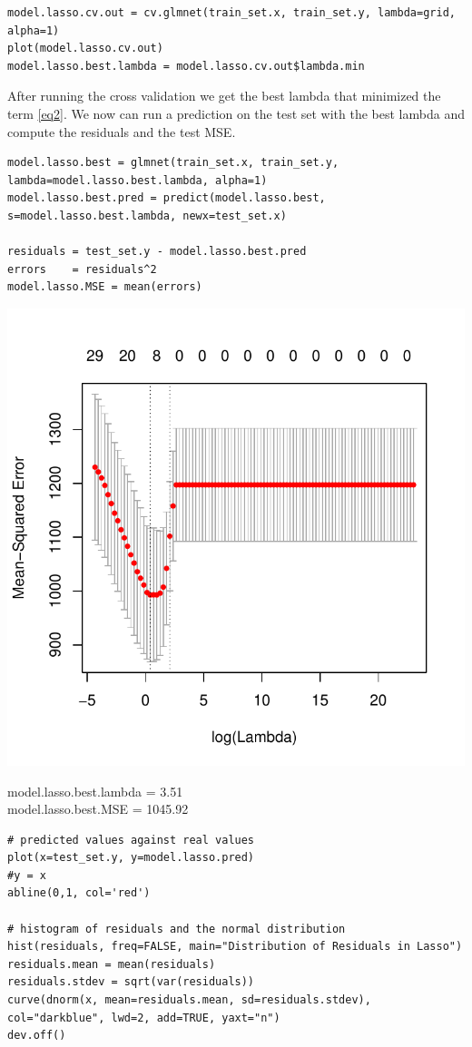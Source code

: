 \documentclass[]{report}
\begin{document}
\begin{lstlisting}
model.lasso.cv.out = cv.glmnet(train_set.x, train_set.y, lambda=grid, alpha=1)
plot(model.lasso.cv.out)
model.lasso.best.lambda = model.lasso.cv.out$lambda.min
\end{lstlisting}

After running the cross validation we get the best lambda that minimized the term \ref{eq2}. We now can run a prediction on the test set with the best lambda and compute the residuals and the test MSE.

\begin{lstlisting}
model.lasso.best = glmnet(train_set.x, train_set.y, lambda=model.lasso.best.lambda, alpha=1)
model.lasso.best.pred = predict(model.lasso.best, s=model.lasso.best.lambda, newx=test_set.x)

residuals = test_set.y - model.lasso.best.pred
errors    = residuals^2
model.lasso.MSE = mean(errors)

\end{lstlisting}

\begin{center}
	\includegraphics[width=0.8\linewidth]{Figures/lasso_mse.pdf}
\end{center}

\begin{center} 
	model.lasso.best.lambda = 3.51 \\
	model.lasso.best.MSE    = 1045.92
\end{center} 

\begin{lstlisting}
# predicted values against real values
plot(x=test_set.y, y=model.lasso.pred)
#y = x
abline(0,1, col='red')

# histogram of residuals and the normal distribution
hist(residuals, freq=FALSE, main="Distribution of Residuals in Lasso")
residuals.mean = mean(residuals)
residuals.stdev = sqrt(var(residuals))
curve(dnorm(x, mean=residuals.mean, sd=residuals.stdev), col="darkblue", lwd=2, add=TRUE, yaxt="n")
dev.off()
\end{lstlisting}
\end{document}
